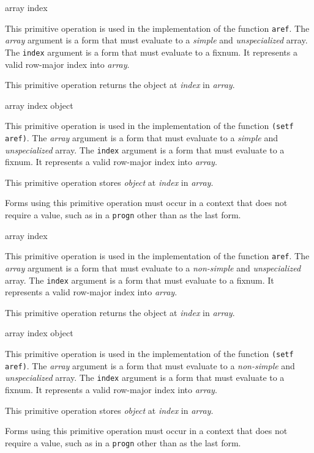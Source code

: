  {array index}

This primitive operation is used in the implementation of the
\commonlisp{} function \texttt{aref}.  The \textit{array} argument is
a form that must evaluate to a \emph{simple} and \emph{unspecialized}
array.  The \texttt{index} argument is a form that must evaluate to a
fixnum.  It represents a valid row-major index into \textit{array}.

This primitive operation returns the object at \textit{index} in
\textit{array}.

 {array index object}

This primitive operation is used in the implementation of the
\commonlisp{} function \texttt{(setf aref)}.  The \textit{array}
argument is a form that must evaluate to a \emph{simple} and
\emph{unspecialized} array.  The \texttt{index} argument is a form
that must evaluate to a fixnum.  It represents a valid row-major index
into \textit{array}.

This primitive operation stores \textit{object} at \textit{index} in
\textit{array}.

Forms using this primitive operation must occur in a context that does
not require a value, such as in a \texttt{progn} other than as the
last form.

 {array index}

This primitive operation is used in the implementation of the
\commonlisp{} function \texttt{aref}.  The \textit{array} argument is
a form that must evaluate to a \emph{non-simple} and
\emph{unspecialized} array.  The \texttt{index} argument is a form
that must evaluate to a fixnum.  It represents a valid row-major index
into \textit{array}.

This primitive operation returns the object at \textit{index} in
\textit{array}.

 {array index object}

This primitive operation is used in the implementation of the
\commonlisp{} function \texttt{(setf aref)}.  The \textit{array}
argument is a form that must evaluate to a \emph{non-simple} and
\emph{unspecialized} array.  The \texttt{index} argument is a form
that must evaluate to a fixnum.  It represents a valid row-major index
into \textit{array}.

This primitive operation stores \textit{object} at \textit{index} in
\textit{array}.

Forms using this primitive operation must occur in a context that does
not require a value, such as in a \texttt{progn} other than as the
last form.

